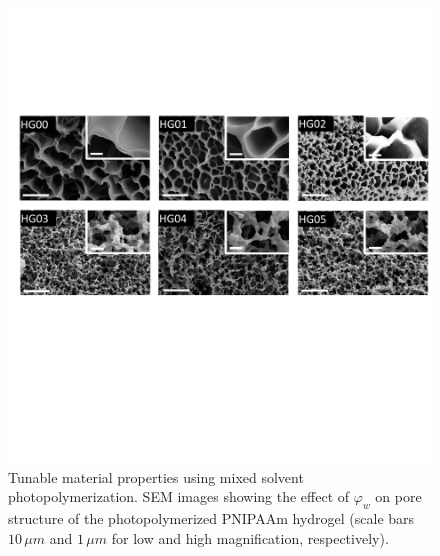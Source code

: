 \begin{figure}[!ht]
\centering
\includegraphics[width=\textwidth]{sem.pdf}
\caption[]{Tunable material properties using mixed solvent photopolymerization.
SEM images showing the effect of $\varphi_w$ on pore structure of the photopolymerized PNIPAAm hydrogel (scale bars $10\,\mu m$ and $1\,\mu m$ for low and high magnification, respectively).}
\label{fig:sem}
\end{figure}

